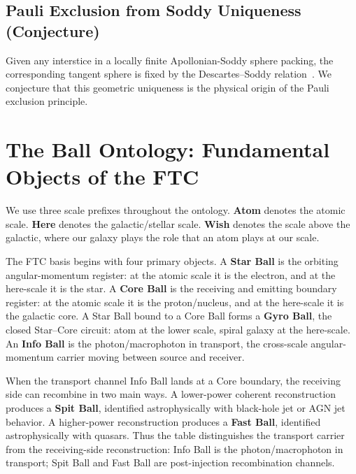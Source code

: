 \documentclass[11pt,a4paper]{article}
\begin{document}
  \subsection{Pauli Exclusion from Soddy Uniqueness (Conjecture)}

    Given any interstice in a locally finite Apollonian-Soddy sphere packing, the corresponding tangent sphere is fixed by the Descartes--Soddy relation~\cite{Soddy1936,Boyd1973,Graham2003}. We conjecture that this geometric uniqueness is the physical origin of the Pauli exclusion principle.

\section{The Ball Ontology: Fundamental Objects of the FTC}

  We use three scale prefixes throughout the ontology. \textbf{Atom} denotes the atomic scale. \textbf{Here} denotes the galactic/stellar scale. \textbf{Wish} denotes the scale above the galactic, where our galaxy plays the role that an atom plays at our scale.

  The FTC basis begins with four primary objects. A \textbf{Star Ball} is the orbiting angular-momentum register: at the atomic scale it is the electron, and at the here-scale it is the star. A \textbf{Core Ball} is the receiving and emitting boundary register: at the atomic scale it is the proton/nucleus, and at the here-scale it is the galactic core. A Star Ball bound to a Core Ball forms a \textbf{Gyro Ball}, the closed Star--Core circuit: atom at the lower scale, spiral galaxy at the here-scale. An \textbf{Info Ball} is the photon/macrophoton in transport, the cross-scale angular-momentum carrier moving between source and receiver.

  When the transport channel Info Ball lands at a Core boundary, the receiving side can recombine in two main ways. A lower-power coherent reconstruction produces a \textbf{Spit Ball}, identified astrophysically with black-hole jet or AGN jet behavior. A higher-power reconstruction produces a \textbf{Fast Ball}, identified astrophysically with quasars. Thus the table distinguishes the transport carrier from the receiving-side reconstruction: Info Ball is the photon/macrophoton in transport; Spit Ball and Fast Ball are post-injection recombination channels.
\end{document}

